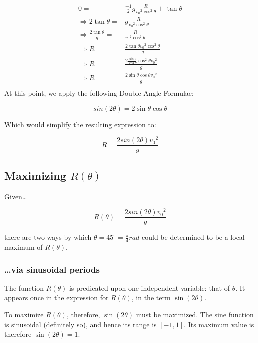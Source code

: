 \documentclass[letterpaper]{article}
\begin{document}
\begin{align}
    0 =& \frac{-1}{2}g\frac{R}{{v_0}^2 \cos^2\theta} + \tan\theta \\
    \Rightarrow 2\tan\theta =& g\frac{R}{{v_0}^2 \cos^2\theta} \\
    \Rightarrow \frac{2\tan\theta}{g} =& \frac{R}{{v_0}^2 \cos^2\theta} \\
    \Rightarrow R =& \frac{2\tan\theta {v_0}^2 \cos^2\theta}{g} \\
    \Rightarrow R =& \frac{2\frac{\sin\theta}{\cos\theta} \cos^2\theta {v_0}^2}{g} \\
    \Rightarrow R =& \frac{2\sin\theta\cos\theta {v_0}^2}{g} \\
\end{align}
At this point, we apply the following Double Angle Formulae:

\begin{equation}
    sin(2\theta)=2\sin\theta\cos\theta
\end{equation}

Which would simplify the resulting expression to:

\begin{equation}
    R = \frac{2sin(2\theta){v_0}^2}{g}
\end{equation}

\subsection{Maximizing \(R(\theta)\)}
\label{sec:orgf528697}
Given\ldots{}

\begin{equation}
    R(\theta) = \frac{2sin(2\theta){v_0}^2}{g}
\end{equation}

there are two ways by which \(\theta=45^{\circ}=\frac{\pi}{4}rad\) could be determined to be a local maximum of \(R(\theta)\).

\subsubsection{\ldots{}via sinusoidal periods}
\label{sec:org61f141f}
The function \(R(\theta)\) is predicated upon one independent variable: that of \(\theta\). It appears once in the expression for \(R(\theta)\), in the term \(\sin(2\theta)\).

To maximize \(R(\theta)\), therefore, \(\sin(2\theta)\) must be maximized. The sine function is sinusoidal (definitely so), and hence its range is \([-1, 1]\). Its maximum value is therefore \(\sin(2\theta) = 1\).
\end{document}
